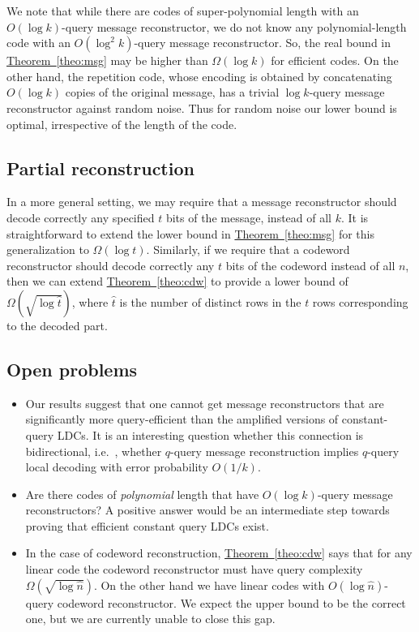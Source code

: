 \documentclass[10pt]{article}
\theoremstyle{definition}
\providecommand{\ie}{i.e.\ }
\numberwithin{equation}{section}
\newcommand{\expref}[2]{\texorpdfstring{\hyperref[#2]{#1~\ref{#2}}}{#1~\ref{#2}}}
\begin{document}
We note that while there are codes of super-polynomial length with an $O(\log k)$-query message reconstructor,
we do not know any polynomial-length code with an $O(\log^2 k)$-query message reconstructor. So, the real bound in \expref{Theorem}{theo:msg} may be  higher than $\Omega(\log k)$ for efficient codes. On the other hand, the repetition code, whose encoding is obtained by
concatenating $O(\log k)$ copies of the original message, has a trivial $\log k$-query message reconstructor against random noise. Thus
for random noise our lower bound is optimal, irrespective of the length of the code.

\subsection{Partial reconstruction}
In a more general setting, we may require that a message reconstructor should decode correctly any specified $t$ bits of the message, instead of all $k$. It is straightforward to extend the lower bound in \expref{Theorem}{theo:msg} for this generalization to $\Omega( \log t)$. Similarly, if we require that a codeword reconstructor should decode correctly any $t$ bits of the codeword instead of all $n$, then we can extend  \expref{Theorem}{theo:cdw} to provide a lower bound of $\Omega(\sqrt{\log \hat{t}})$, where $\hat{t}$ is the number of distinct rows in the $t$ rows corresponding to the decoded part.

\subsection{Open problems}
\begin{itemize}
\item Our results suggest that one cannot get message reconstructors that are significantly more query-efficient than the amplified versions of constant-query LDCs. It is an interesting question whether this connection is bidirectional, \ie, whether $q$-query message reconstruction implies $q$-query local decoding with error probability $O(1/k)$.

\item  Are there codes of \emph{polynomial} length that have $O(\log k)$-query message
reconstructors? A positive answer would be an intermediate step towards proving that efficient constant query LDCs exist.

\item In the case of codeword reconstruction, \expref{Theorem}{theo:cdw} says that
for any linear code the codeword reconstructor must have query
complexity $\Omega(\sqrt{\log \hat{n}})$. On the other hand we have linear
codes with $O(\log \hat{n})$-query codeword reconstructor. We expect the
upper bound to be the correct one, but we are currently unable to close this gap.

%
%
%
%

\end{itemize}
\end{document}
